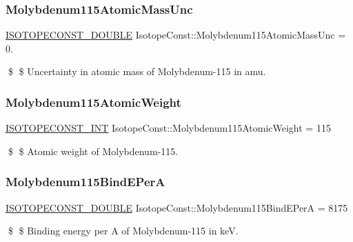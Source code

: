 \subsubsection{\texorpdfstring{Molybdenum115\+Atomic\+Mass\+Unc}{Molybdenum115AtomicMassUnc}}
{\footnotesize\ttfamily \mbox{\hyperlink{group___isotope_const-_macros_ga8f45a7272ce02c0b4c65c44636ed719a}{I\+S\+O\+T\+O\+P\+E\+C\+O\+N\+S\+T\+\_\+\+D\+O\+U\+B\+LE}} Isotope\+Const\+::\+Molybdenum115\+Atomic\+Mass\+Unc = 0.}

\$ \$ Uncertainty in atomic mass of Molybdenum-\/115 in amu. \mbox{\label{group___isotope_const-_molybdenum-_mo115_gacf3d9f0f930612a9f69f4e3cb88c1e31}} 
\subsubsection{\texorpdfstring{Molybdenum115\+Atomic\+Weight}{Molybdenum115AtomicWeight}}
{\footnotesize\ttfamily \mbox{\hyperlink{group___isotope_const-_macros_ga5f18360b3e99483a35c32d789e62621c}{I\+S\+O\+T\+O\+P\+E\+C\+O\+N\+S\+T\+\_\+\+I\+NT}} Isotope\+Const\+::\+Molybdenum115\+Atomic\+Weight = 115}

\$ \$ Atomic weight of Molybdenum-\/115. \mbox{\label{group___isotope_const-_molybdenum-_mo115_gaf196c91535e372289780299d058b1778}} 
\subsubsection{\texorpdfstring{Molybdenum115\+Bind\+E\+PerA}{Molybdenum115BindEPerA}}
{\footnotesize\ttfamily \mbox{\hyperlink{group___isotope_const-_macros_ga8f45a7272ce02c0b4c65c44636ed719a}{I\+S\+O\+T\+O\+P\+E\+C\+O\+N\+S\+T\+\_\+\+D\+O\+U\+B\+LE}} Isotope\+Const\+::\+Molybdenum115\+Bind\+E\+PerA = 8175}

\$ \$ Binding energy per A of Molybdenum-\/115 in keV. \mbox{\label{group___isotope_const-_molybdenum-_mo115_ga4e8093decaf214aafb67c630fa16e14f}} 
